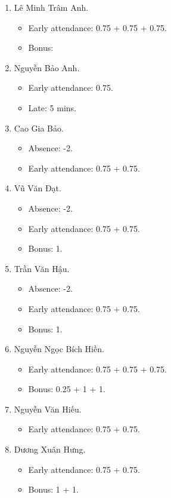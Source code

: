 \documentclass{article}
\begin{document}
\begin{enumerate}
	\item {\sc Lê Minh Trâm Anh.}
	\begin{itemize}
		\item Early attendance: 0.75 + 0.75 + 0.75.
		\item Bonus: 
	\end{itemize}
	\item {\sc Nguyễn Bảo Anh.}
	\begin{itemize}
		\item Early attendance: 0.75.
		\item Late: 5 mins.
	\end{itemize}
	\item {\sc Cao Gia Bảo.}
	\begin{itemize}
		\item Absence: -2.
		\item Early attendance: 0.75 + 0.75.
	\end{itemize}
	\item {\sc Vũ Văn Đạt.}
	\begin{itemize}
		\item Absence: -2.
		\item Early attendance: 0.75 + 0.75.
		\item Bonus: 1.
	\end{itemize}
	\item {\sc Trần Văn Hậu.}
	\begin{itemize}
		\item Absence: -2.
		\item Early attendance: 0.75 + 0.75.
		\item Bonus: 1.
	\end{itemize}
	\item {\sc Nguyễn Ngọc Bích Hiền.}
	\begin{itemize}
		\item Early attendance: 0.75 + 0.75 + 0.75.
		\item Bonus: 0.25 + 1 + 1.
	\end{itemize}
	\item {\sc Nguyễn Văn Hiếu.}
	\begin{itemize}
		\item Early attendance: 0.75 + 0.75.
	\end{itemize}
	\item {\sc Dương Xuân Hưng.}
	\begin{itemize}
		\item Early attendance: 0.75 + 0.75.
		\item Bonus: 1 + 1.

\end{itemize}
\end{enumerate}
\end{document}
